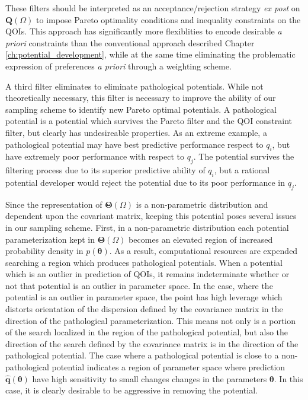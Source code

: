 These filters should be interpreted as an acceptance/rejection strategy \emph{ex post} on $\bm{Q}(\Omega)$ to impose Pareto optimality conditions and inequality constraints on the QOIs.  This approach has significantly more flexiblities to encode desirable \emph{a priori} constraints than the conventional approach described Chapter \ref{ch:potential_development}, while at the same time eliminating the problematic expression of preferences \emph{a priori} through a weighting scheme.

A third filter eliminates to eliminate pathological potentials.  While not theoretically necessary, this filter is necessary to improve the ability of our sampling scheme to identify new Pareto optimal potentials.  A pathological potential is a potential which survives the Pareto filter and the QOI constraint filter, but clearly has undesireable properties.  As an extreme example, a pathological potential may have best predictive performance respect to $q_i$, but have extremely poor performance with respect to $q_j$.  The potential survives the filtering process due to its superior predictive ability of $q_i$, but a rational potential developer would reject the potential due to its poor performance in $q_j$.

  Since the representation of $\bm{\Theta}(\Omega)$ is a non-parametric distribution and dependent upon the covariant matrix, keeping this potential poses several issues in our sampling scheme.  First, in a non-parametric distribution each potential parameterization kept in $\bm{\Theta}(\Omega)$ becomes an elevated region of increased probability density in $p(\bm{\theta})$.  As a result, computational resources are expended searching a region which produces pathological potentials.  When a potential which is an outlier in prediction of QOIs, it remains indeterminate whether or not that potential is an outlier in parameter space.  In the case, where the potential is an outlier in parameter space, the point has high leverage which distorts orientation of the dispersion defined by the covariance matrix in the direction of the pathological parameterization.  This means not only is a portion of the search localized in the region of the pathological potential, but also the direction of the search defined by the covariance matrix is in the direction of the pathological potential.  The case where a pathological potential is close to a non-pathological potential indicates a region of parameter space where prediction $\hat{\bm{q}}(\bm{\theta})$ have high sensitivity to small changes changes in the parameters $\bm{\theta}$.  In this case, it is clearly desirable to be aggressive in removing the potential.


